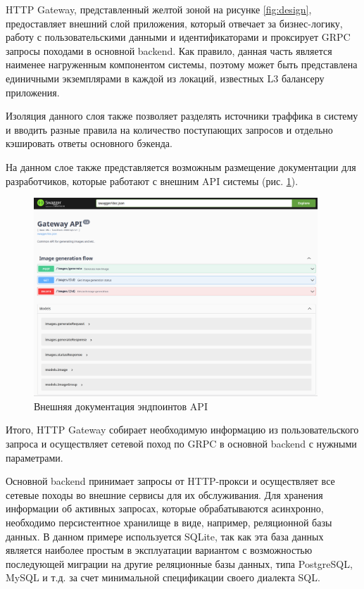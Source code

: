 HTTP Gateway, представленный желтой зоной на рисунке \ref{fig:design}, предоставляет внешний слой приложения, который отвечает за бизнес-логику,
работу с пользовательскими данными и идентификаторами и проксирует GRPC запросы походами в основной backend.
Как правило, данная часть является наименее нагруженным компонентом системы, поэтому может быть 
представлена единичными экземплярами в каждой из локаций, известных L3 балансеру приложения.

Изоляция данного слоя также позволяет разделять источники траффика в систему и вводить разные
правила на количество поступающих запросов и отдельно кэшировать ответы основного бэкенда.

На данном слое также представляется возможным размещение документации для разработчиков, которые работают
с внешним API системы (рис. \ref{fig:swag}).

\begin{footnotesize}
\begin{figure}[H]
  \centering
  \includegraphics[width=0.95\textwidth]{img/swag.png}
  \caption{Внешняя документация эндпоинтов API}
    \label{fig:swag}
\end{figure}
\end{footnotesize}

Итого, HTTP Gateway собирает необходимую информацию из пользовательского запроса и осуществляет сетевой
поход по GRPC в основной backend с нужными параметрами.

Основной backend принимает запросы от HTTP-прокси и осуществляет все сетевые походы во внешние сервисы для
их обслуживания. Для хранения информации об активных запросах, которые обрабатываются асинхронно, необходимо персистентное 
хранилище в виде, например, реляционной базы данных. В данном примере используется SQLite, так как эта
база данных является наиболее простым в эксплуатации вариантом с возможностью последующей
миграции на другие реляционные базы данных, типа PostgreSQL, MySQL и т.д. за счет минимальной
спецификации своего диалекта SQL.

